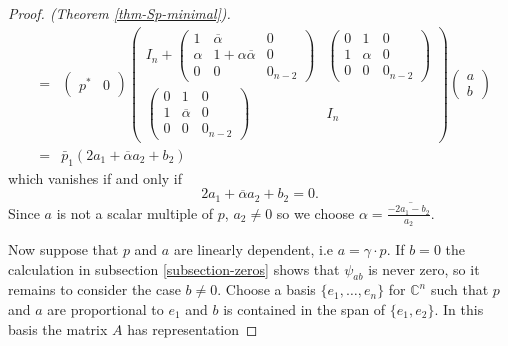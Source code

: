 \documentclass[11pt,reqno]{amsart}
\theoremstyle{plain}
\theoremstyle{definition}
\numberwithin{equation}{section}
\def \cn{{\mathbb C}}
\numberwithin{equation}{section}
\begin{document}
\begin{proof}[Proof. (Theorem \ref{thm-Sp-minimal})]
\begin{eqnarray*}
	&=& \begin{pmatrix}
p^* & 0
\end{pmatrix} 
\begin{pmatrix}
		I_n+ \begin{pmatrix}
		1 & \overline{\alpha} &0 \\ \alpha  & 1+\alpha \overline{\alpha} & 0 \\ 0 & 0 & 0_{n-2}
		\end{pmatrix}  & \begin{pmatrix}
		0 & 1 &0 \\ 1  & \alpha & 0 \\ 0 & 0 & 0_{n-2}
		\end{pmatrix} \\ \begin{pmatrix}
		0  & 1 &0 \\ 1  & \overline{\alpha} & 0 \\ 0 & 0 & 0_{n-2}
		\end{pmatrix} & I_{n} 
	\end{pmatrix} 
\begin{pmatrix}
	a \\ b
\end{pmatrix} \\
&=& \bar p_1(2a_1+\overline{\alpha}a_2+b_2)
	\end{eqnarray*} 
	which vanishes if and only if 
	$$2a_1+\overline{\alpha}a_2+b_2 = 0.$$
	Since $a$ is not a scalar multiple of $p$, $a_2 \neq 0$ so we choose $\alpha = \overline{ \frac{-2a_1-b_2}{a_2}.}$ 
	

Now suppose that $p$ and $a$ are linearly dependent, i.e $ a = \gamma \cdot p$. If $b = 0$ the calculation in subsection \ref{subsection-zeros} shows that $\psi_{ab}$ is never zero, so it remains to consider the case $b \neq 0$. Choose a basis $\{e_1,\dots, e_n\}$ for $\cn^n$ such that $p$ and $a$ are proportional to $e_1$ and $b$ is contained in the span of $\{e_1,e_2\}$. In this basis the matrix $A$ has representation


\end{proof}
\end{document}
